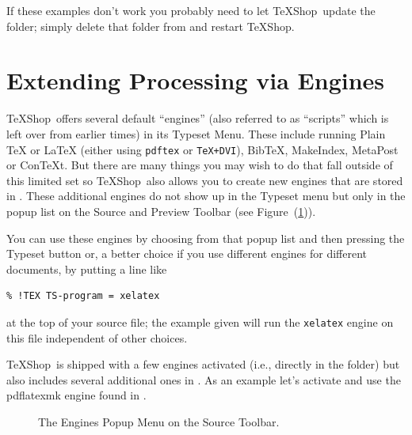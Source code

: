 \documentclass[letterpaper,11pt]{article}
\newcommand{\TS}{\textsf{\TeX Shop}}
\newcommand{\cmd}[1]{\textsf{#1}}
\newcommand{\mnu}[1]{\textsf{#1}}
\begin{document}
If these examples don't work you probably need to let \TS\ update the  folder; simply delete that folder from  and restart \TS.

\section{Extending Processing via Engines}

\TS\ offers several default ``engines'' (also referred to as ``scripts'' which is left over from earlier times) in its \mnu{Typeset} Menu. These include running \mnu{Plain TeX} or \mnu{LaTeX} (either using \texttt{pdftex} or \texttt{TeX+DVI}), \mnu{BibTeX}, \mnu{MakeIndex}, \mnu{MetaPost} or \mnu{ConTeXt}. But there are many things you may wish to do that fall outside of this limited set so \TS\ also allows you to create new engines that are stored in . These additional engines do not show up in the \mnu{Typeset} menu but only in the popup list on the Source and Preview Toolbar (see Figure~(\ref{fig:EnginesPopup})). 

You can use these engines by choosing from that popup list and then pressing the Typeset button or, a better choice if you use different engines for different documents, by putting a line like
\begin{verbatim}
% !TEX TS-program = xelatex
\end{verbatim}
at the top of your source file; the example given will run the \texttt{xelatex} engine on this file independent of other choices.

\TS\ is shipped with a few engines activated (i.e., directly in the  folder) but also includes several additional ones in . As an example let's activate and use the \cmd{pdflatexmk} engine found in .

\begin{figure}
\centering
{}
\caption{The Engines Popup Menu on the Source Toolbar.}
\label{fig:EnginesPopup}
\end{figure}
\end{document}
